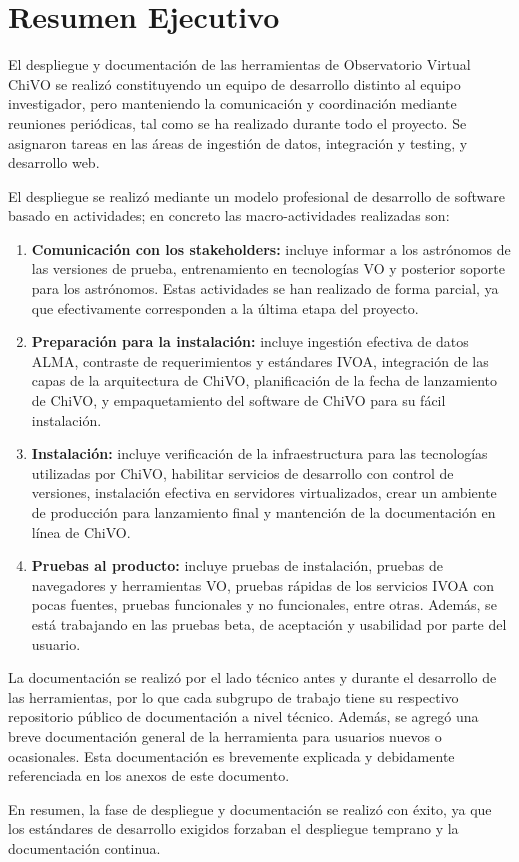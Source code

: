 \section{Resumen Ejecutivo}

El despliegue y documentación de las herramientas de Observatorio Virtual ChiVO
se realizó constituyendo un equipo de desarrollo distinto al equipo
investigador, pero manteniendo la comunicación y coordinación mediante
reuniones periódicas, tal como se ha realizado durante todo el proyecto. 
Se asignaron tareas en las áreas de ingestión de datos, integración
y testing, y desarrollo web. 

El despliegue se realizó mediante un modelo
profesional de desarrollo de software basado en actividades; 
en concreto las macro-actividades realizadas son:
\begin{enumerate}
\item \textbf{Comunicación con los stakeholders:} incluye informar a los astrónomos de
las versiones de prueba, entrenamiento en tecnologías VO y
posterior soporte para los astrónomos. Estas actividades se han realizado de
forma parcial, ya que efectivamente corresponden a la última etapa del proyecto.
\item \textbf{Preparación para la instalación:} incluye ingestión efectiva de datos
ALMA, contraste de requerimientos y estándares IVOA, integración de las capas de
la arquitectura de ChiVO, planificación de la fecha de lanzamiento de ChiVO, y
empaquetamiento del software de ChiVO para su fácil instalación.
\item \textbf{Instalación:} incluye verificación de la infraestructura para 
las tecnologías utilizadas por ChiVO, habilitar servicios de desarrollo con
control de versiones, instalación efectiva en servidores virtualizados, 
crear un ambiente de producción para lanzamiento final y mantención de
la documentación en línea de ChiVO.
\item \textbf{Pruebas al producto:} incluye pruebas de instalación,
pruebas de navegadores y herramientas VO, pruebas rápidas de los servicios
IVOA con pocas fuentes, pruebas funcionales y no funcionales, entre otras.
Además, se está trabajando en las pruebas beta, de aceptación y usabilidad
por parte del usuario.
\end{enumerate}

La documentación se realizó por el lado técnico antes y durante el desarrollo
de las herramientas, por lo que cada subgrupo de trabajo tiene su respectivo
repositorio público de documentación a nivel técnico. Además, se agregó una 
breve documentación general de la herramienta para usuarios nuevos o
ocasionales. Esta documentación es brevemente explicada y debidamente
referenciada en los anexos de este documento.

En resumen, la fase de despliegue y documentación se realizó con éxito,
ya que los estándares de desarrollo exigidos forzaban el despliegue temprano
y la documentación continua. 


